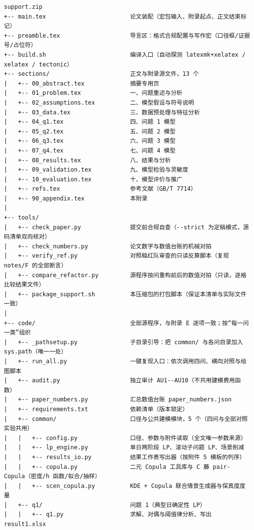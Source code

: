 \begin{lstlisting}[style=plain]
support.zip
+-- main.tex                        论文装配（宏包输入、附录起点、正文结束标记）
+-- preamble.tex                    导言区：格式合规配置与写作宏（口径框/证据号/占位符）
+-- build.sh                        编译入口（自动探测 latexmk+xelatex / xelatex / tectonic）
+-- sections/                       正文与附录源文件，13 个
|   +-- 00_abstract.tex             摘要专用页
|   +-- 01_problem.tex              一、问题重述与分析
|   +-- 02_assumptions.tex          二、模型假设与符号说明
|   +-- 03_data.tex                 三、数据预处理与特征分析
|   +-- 04_q1.tex                   四、问题 1 模型
|   +-- 05_q2.tex                   五、问题 2 模型
|   +-- 06_q3.tex                   六、问题 3 模型
|   +-- 07_q4.tex                   七、问题 4 模型
|   +-- 08_results.tex              八、结果与分析
|   +-- 09_validation.tex           九、模型检验与灵敏度
|   +-- 10_evaluation.tex           十、模型评价与推广
|   +-- refs.tex                    参考文献（GB/T 7714）
|   +-- 90_appendix.tex             本附录
|
+-- tools/
|   +-- check_paper.py              提交前合规自查（--strict 为定稿模式，源码清单双向核对）
|   +-- check_numbers.py            论文数字与数值台账的机械对拍
|   +-- verify_ref.py               对照稿红队审查的只读反算脚本（复现 notes/F 的全部断言）
|   +-- compare_refactor.py         源程序按问重构前后的数值对拍（只读，逐格比较结果文件）
|   +-- package_support.sh          本压缩包的打包脚本（保证本清单与实际文件一致）
|
+-- code/                           全部源程序，与附录 E 逐项一致；按“每一问一类”组织
|   +-- _pathsetup.py               子目录引导：把 common/ 与各问目录加入 sys.path（唯一一处）
|   +-- run_all.py                  一键复现入口：依次调用四问、横向对照与绘图脚本
|   +-- audit.py                    独立审计 AU1--AU10（不共用建模费用函数）
|   +-- paper_numbers.py            汇总数值台账 paper_numbers.json
|   +-- requirements.txt            依赖清单（版本锁定）
|   +-- common/                     口径与公共建模模块，5 个（四问与全部对照实验共用）
|   |   +-- config.py               口径、参数与附件读取（全文唯一参数来源）
|   |   +-- lp_engine.py            单日两阶段 LP、滚动子问题 LP、场景削减
|   |   +-- results_io.py           结果工作表写出器（按附件 5 模板的列序）
|   |   +-- copula.py               二元 Copula 工具库与 C 藤 pair-Copula（密度/h 函数/拟合/抽样）
|   |   +-- scen_copula.py          KDE + Copula 联合情景生成器与保真度度量
|   +-- q1/                         问题 1（典型日确定性 LP）
|   |   +-- q1.py                   求解、对偶与阈值律分析、写出 result1.xlsx

\end{lstlisting}
